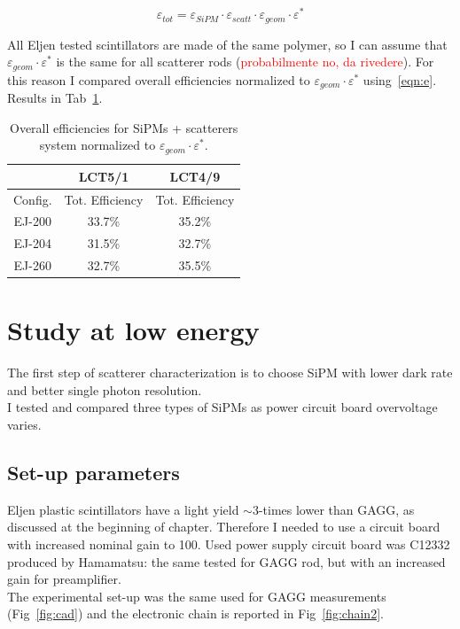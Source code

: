\documentclass[10pt,a4paper, openany]{book}
\begin{document}
\begin{equation}
\varepsilon_{tot} = \varepsilon_{SiPM} \cdot \varepsilon_{scatt} \cdot \varepsilon_{geom} \cdot \varepsilon^*
\end{equation}

All Eljen tested scintillators are made of the same polymer, so I can assume that $\varepsilon_{geom} \cdot \varepsilon^*$ is the same for all scatterer rods (\textcolor{red}{probabilmente no, da rivedere}). For this reason I compared overall efficiencies normalized to $\varepsilon_{geom} \cdot \varepsilon^*$ using~\ref{eqn:e}. Results in Tab~\ref{tab:eff}.

\begin{center}
\begin{table}
\label{tab:eff}
\caption{Overall efficiencies for SiPMs + scatterers system normalized to $\varepsilon_{geom} \cdot \varepsilon^*$.}
\begin{tabular}{ccc}
 &\textbf{LCT5/1} & \textbf{LCT4/9} \\
\toprule
Config. & Tot. Efficiency & Tot. Efficiency\\
\midrule
EJ-200 & 33.7\% & 35.2\%\\
EJ-204 & 31.5\% & 32.7\% \\
EJ-260 & 32.7\% & 35.5\%\\
\bottomrule
\end{tabular}
\end{table}
\end{center}


\section{Study at low energy}
The first step of scatterer characterization is to choose SiPM with lower dark rate and better single photon resolution.\\
I tested and compared three types of SiPMs as power circuit board overvoltage varies.

\subsection{Set-up parameters}
Eljen plastic scintillators have a light yield $\sim 3$-times lower than GAGG, as discussed at the beginning of chapter. Therefore I needed to use a circuit board with increased nominal gain to 100. Used power supply circuit board was C12332 produced by Hamamatsu: the same tested for GAGG rod, but with an increased gain for preamplifier. \\
The experimental set-up was the same used for GAGG measurements (Fig~\ref{fig:cad}) and the electronic chain is reported in Fig~\ref{fig:chain2}.
\end{document}
